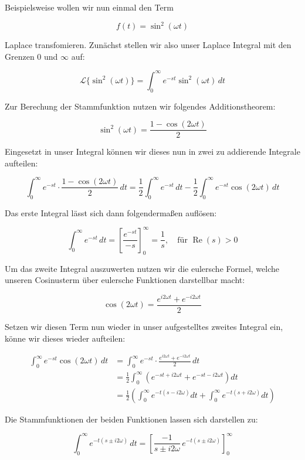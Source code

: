     
Beispielsweise wollen wir nun einmal den Term

\[
f(t) = \sin^2(\omega t)
\]

Laplace transfomieren.
Zunächst stellen wir also unser Laplace Integral mit den Grenzen 0 und \(\infty\) auf:

\[
\mathcal{L} \{ \sin^2(\omega t) \} = \int_0^{\infty} e^{-st} \sin^2(\omega t) \, dt
\]

Zur Berechung der Stammfunktion nutzen wir folgendes Additionstheorem:

\[
\sin^2(\omega t) = \frac{1 - \cos(2\omega t)}{2}
\]

Eingesetzt in unser Integral können wir dieses nun in zwei zu addierende Integrale aufteilen:

\[
\int_0^{\infty} e^{-st} \cdot \frac{1 - \cos(2\omega t)}{2} \, dt 
= \frac{1}{2} \int_0^{\infty} e^{-st} \, dt 
- \frac{1}{2} \int_0^{\infty} e^{-st} \cos(2\omega t) \, dt
\]

Das erste Integral lässt sich dann folgendermaßen auflösen:

\[
\int_0^{\infty} e^{-st} \, dt = \left[ \frac{e^{-st}}{-s} \right]_0^{\infty} = \frac{1}{s}, \quad \text{für } \operatorname{Re}(s) > 0
\]

Um das zweite Integral auszuwerten nutzen wir die eulersche Formel, welche unseren Cosinusterm über eulersche Funktionen darstellbar macht:

\[
\cos(2\omega t) = \frac{e^{i 2\omega t} + e^{-i 2\omega t}}{2}
\]

Setzen wir diesen Term nun wieder in unser aufgestelltes zweites Integral ein, könne wir dieses wieder aufteilen:

\[
\begin{aligned}
\int_0^{\infty} e^{-st} \cos(2\omega t) \, dt 
&= \int_0^{\infty} e^{-st} \cdot \frac{e^{i 2\omega t} + e^{-i 2\omega t}}{2} \, dt \\
&= \frac{1}{2} \int_0^{\infty} \left( e^{-st + i 2\omega t} + e^{-st - i 2\omega t} \right) dt \\
&= \frac{1}{2} \left( \int_0^{\infty} e^{-t(s - i 2\omega)} dt + \int_0^{\infty} e^{-t(s + i 2\omega)} dt \right)
\end{aligned}
\]

Die Stammfunktionen der beiden Funktionen lassen sich darstellen zu:

\[
\int_0^{\infty} e^{-t(s \pm i 2\omega)} \, dt 
= \left[ \frac{-1}{s \pm i 2\omega} \, e^{-t(s \pm i 2\omega)} \right]_0^{\infty}
\]

